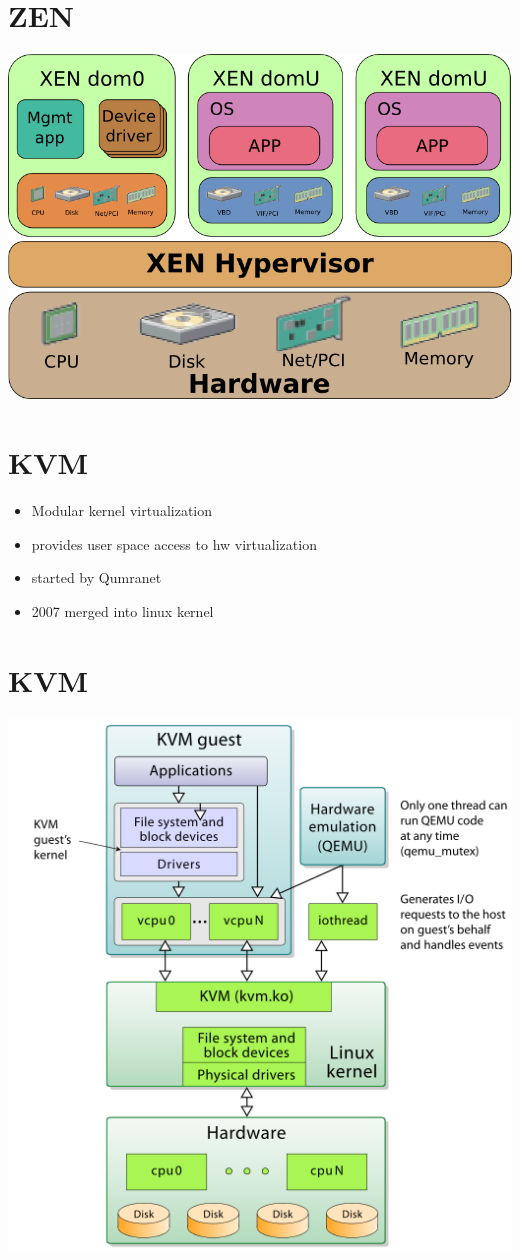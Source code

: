 \documentclass[11pt]{article}
\begin{document}
\section*{ZEN}
\label{sec:org9b5c7e6}
\begin{center}
\includegraphics[width=.9\linewidth]{./xen.png}
\end{center}

\section*{KVM}
\label{sec:orgd4b4dc4}
\begin{itemize}
\item Modular kernel virtualization
\item provides user space access to hw virtualization
\item started by Qumranet
\item 2007 merged into linux kernel
\end{itemize}

\section*{KVM}
\label{sec:orgc2437dd}
\begin{center}
\includegraphics[width=.9\linewidth]{./kvm.png}
\end{center}
\end{document}
